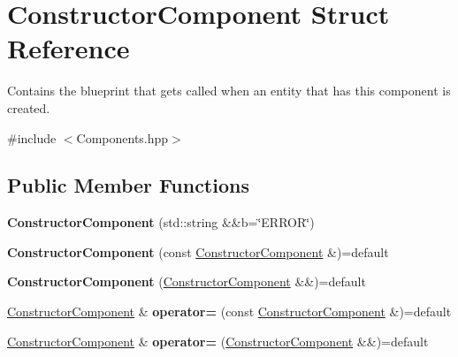 \hypertarget{struct_constructor_component}{}\section{Constructor\+Component Struct Reference}
\label{struct_constructor_component}


Contains the blueprint that gets called when an entity that has this component is created.  




{\ttfamily \#include $<$Components.\+hpp$>$}

\subsection*{Public Member Functions}
\begin{DoxyCompactItemize}
\item 
{\bfseries Constructor\+Component} (std\+::string \&\&b=\char`\"{}E\+R\+R\+OR\char`\"{})\hypertarget{struct_constructor_component_ab291d85807523b0a1b80187e39d4b7a6}{}\label{struct_constructor_component_ab291d85807523b0a1b80187e39d4b7a6}

\item 
{\bfseries Constructor\+Component} (const \hyperlink{struct_constructor_component}{Constructor\+Component} \&)=default\hypertarget{struct_constructor_component_a1bfd4f79ccf7f3237060829d2388d854}{}\label{struct_constructor_component_a1bfd4f79ccf7f3237060829d2388d854}

\item 
{\bfseries Constructor\+Component} (\hyperlink{struct_constructor_component}{Constructor\+Component} \&\&)=default\hypertarget{struct_constructor_component_a5c30a6dcdfa20d20d942291a01db5aa8}{}\label{struct_constructor_component_a5c30a6dcdfa20d20d942291a01db5aa8}

\item 
\hyperlink{struct_constructor_component}{Constructor\+Component} \& {\bfseries operator=} (const \hyperlink{struct_constructor_component}{Constructor\+Component} \&)=default\hypertarget{struct_constructor_component_aabdc97a09d8df58ef5cc340490aa6df7}{}\label{struct_constructor_component_aabdc97a09d8df58ef5cc340490aa6df7}

\item 
\hyperlink{struct_constructor_component}{Constructor\+Component} \& {\bfseries operator=} (\hyperlink{struct_constructor_component}{Constructor\+Component} \&\&)=default\hypertarget{struct_constructor_component_a1a1dfcde5f8261d2bcf682e78402e194}{}\label{struct_constructor_component_a1a1dfcde5f8261d2bcf682e78402e194}

\end{DoxyCompactItemize}

